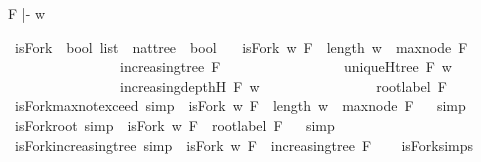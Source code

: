 \begin{isabellebody}
%
\endisadelimproof
%
\begin{isamarkuptext}%
F |- w%
\end{isamarkuptext}\isamarkuptrue%
\isamarkupfalse%
\ isFork\ {\isacharcolon}{\isacharcolon}\ {\isachardoublequoteopen}bool\ list\ {\isasymRightarrow}\ nattree\ {\isasymRightarrow}\ bool{\isachardoublequoteclose}\ \isanewline
\ \ {\isachardoublequoteopen}isFork\ w\ F\ {\isacharequal}\ {\isacharparenleft}{\isacharparenleft}length\ w\ {\isasymge}\ max{\isacharunderscore}node\ F{\isacharparenright}\ \isanewline
\ \ \ \ \ \ \ \ \ \ \ \ \ \ \ {\isasymand}\ {\isacharparenleft}increasing{\isacharunderscore}tree\ F{\isacharparenright}\ \isanewline
\ \ \ \ \ \ \ \ \ \ \ \ \ \ \ {\isasymand}\ {\isacharparenleft}uniqueH{\isacharunderscore}tree\ F\ w{\isacharparenright}\ \isanewline
\ \ \ \ \ \ \ \ \ \ \ \ \ \ \ {\isasymand}\ {\isacharparenleft}increasing{\isacharunderscore}depth{\isacharunderscore}H\ F\ w{\isacharparenright}\isanewline
\ \ \ \ \ \ \ \ \ \ \ \ \ \ \ {\isasymand}\ root{\isacharunderscore}label{\isacharunderscore}{}\ F{\isacharparenright}{\isachardoublequoteclose}\isanewline
\isanewline
{}\isamarkupfalse%
\ isFork{\isacharunderscore}max{\isacharunderscore}not{\isacharunderscore}exceed\ {\isacharbrackleft}simp{\isacharbrackright}\ {\isacharcolon}\ {\isachardoublequoteopen}isFork\ w\ F\ {\isasymlongrightarrow}\ length\ w\ {\isasymge}\ max{\isacharunderscore}node\ F{\isachardoublequoteclose}%
\isadelimproof
\ %
\endisadelimproof
%
\isatagproof
{}\isamarkupfalse%
\ simp%
\endisatagproof
{\isafoldproof}%
%
\isadelimproof
%
\endisadelimproof
\isanewline
\isanewline
{}\isamarkupfalse%
\ isFork{\isacharunderscore}root{\isacharunderscore}{}\ {\isacharbrackleft}simp{\isacharbrackright}\ {\isacharcolon}\ {\isachardoublequoteopen}isFork\ w\ F\ {\isasymlongrightarrow}\ root{\isacharunderscore}label{\isacharunderscore}{}\ F{\isachardoublequoteclose}%
\isadelimproof
\ %
\endisadelimproof
%
\isatagproof
{}\isamarkupfalse%
\ simp%
\endisatagproof
{\isafoldproof}%
%
\isadelimproof
%
\endisadelimproof
\isanewline
\isanewline
{}\isamarkupfalse%
\ isFork{\isacharunderscore}increasing{\isacharunderscore}tree\ {\isacharbrackleft}simp{\isacharbrackright}\ {\isacharcolon}\ {\isachardoublequoteopen}isFork\ w\ F\ {\isasymlongrightarrow}\ increasing{\isacharunderscore}tree\ F{\isachardoublequoteclose}\isanewline
%
\isadelimproof
\ \ %
\endisadelimproof
%
\isatagproof
{}\isamarkupfalse%
\ isFork{\isachardot}simps\ \isamarkupfalse%

\end{isabellebody}
